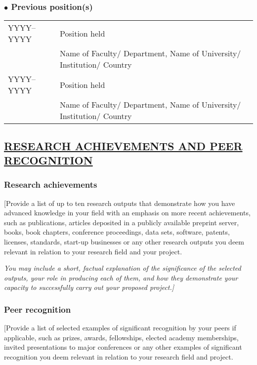 \documentclass{article}
\begin{document}
\subsubsection*{$\bullet$ Previous position(s)}

\begin{tabular}{m{8em} m{32em}}
     YYYY--YYYY	& Position held \\
                & Name of Faculty/ Department, Name of University/ Institution/ Country \\
     YYYY--YYYY	& Position held \\
                & Name of Faculty/ Department, Name of University/ Institution/ Country \\
\end{tabular}

\subsection*{\underline{RESEARCH ACHIEVEMENTS AND PEER RECOGNITION}}

\subsubsection*{Research achievements}

[Provide a list of up to ten research outputs that demonstrate how you have advanced knowledge in your field with an emphasis on more recent achievements, such as publications, articles deposited in a publicly available preprint server, books, book chapters, conference proceedings, data sets, software, patents, licenses, standards, start-up businesses or any other research outputs you deem relevant in relation to your research field and your project.

\textit{You may include a short, factual explanation of the significance of the selected outputs, your role in producing each of them, and how they demonstrate your capacity to successfully carry out your proposed project.]}


\subsubsection*{Peer recognition}

[Provide a list of selected examples of significant recognition by your peers if applicable, such as prizes, awards, fellowships, elected academy memberships, invited presentations to major conferences or any other examples of significant recognition you deem relevant in relation to your research field and project.
\end{document}
